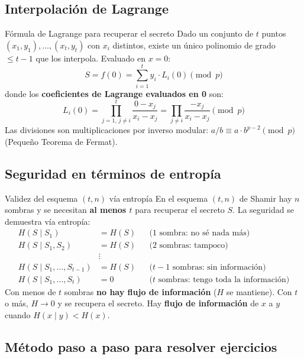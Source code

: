 \documentclass[11pt,a4paper]{article}
\begin{document}
\subsection{Interpolación de Lagrange}

\begin{teoriabox}{Fórmula de Lagrange para recuperar el secreto}
Dado un conjunto de $t$ puntos $(x_1,y_1),\dots,(x_t,y_t)$ con $x_i$ distintos, existe un único polinomio de grado $\le t-1$ que los interpola. Evaluado en $x=0$:
\[
  S = f(0) = \sum_{i=1}^{t} y_i \cdot L_i(0) \pmod{p}
\]
donde los \textbf{coeficientes de Lagrange evaluados en 0} son:
\[
  L_i(0) = \prod_{j=1,\, j\neq i}^{t} \frac{0 - x_j}{x_i - x_j} = \prod_{j \neq i} \frac{-x_j}{x_i - x_j} \pmod{p}
\]
Las divisiones son multiplicaciones por inverso modular: $a/b \equiv a \cdot b^{p-2} \pmod{p}$ (Pequeño Teorema de Fermat).
\end{teoriabox}

\subsection{Seguridad en términos de entropía}

\begin{teoriabox}{Validez del esquema $(t,n)$ vía entropía}
En el esquema $(t,n)$ de Shamir hay $n$ sombras y se necesitan \textbf{al menos $t$} para recuperar el secreto $S$. La seguridad se demuestra vía entropía:
\[
\begin{aligned}
  H(S \mid S_1) &= H(S) & &\text{(1 sombra: no sé nada más)}\\
  H(S \mid S_1, S_2) &= H(S) & &\text{(2 sombras: tampoco)}\\
  &\vdots \\
  H(S \mid S_1, \dots, S_{t-1}) &= H(S) & &\text{($t{-}1$ sombras: sin información)}\\
  H(S \mid S_1, \dots, S_t) &= 0 & &\text{($t$ sombras: tengo toda la información)}
\end{aligned}
\]
Con menos de $t$ sombras \textbf{no hay flujo de información} ($H$ se mantiene). Con $t$ o más, $H \to 0$ y se recupera el secreto. Hay \textbf{flujo de información} de $x$ a $y$ cuando $H(x \mid y) < H(x)$.
\end{teoriabox}

\subsection{Método paso a paso para resolver ejercicios}
\end{document}
